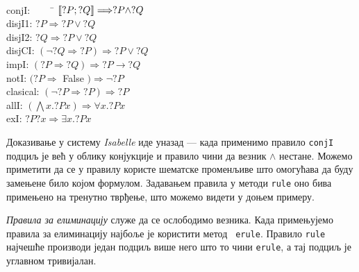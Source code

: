 \begin{small}
{\tt 
\begin{tabbing}
 conjI:\ \ \ \ \ \= $\llbracket ?P ; ?Q \rrbracket \Longrightarrow ?P \land ?Q$   \\
 disjI1: \> $?P \Longrightarrow ?P \lor ?Q$ \\
 disjI2: \> $?Q \Longrightarrow ?P \lor ?Q$ \\
 disjCI: \> $(\neg ?Q \Longrightarrow ?P) \Longrightarrow ?P \lor ?Q$ \\
 impI:   \> $(?P \Longrightarrow ?Q) \Longrightarrow ?P \longrightarrow ?Q$ \\
 notI:   \> $(?P \Longrightarrow$ False $) \Longrightarrow \neg ?P$ \\
 clasical: \> $(\neg ?P \Longrightarrow ?P) \Longrightarrow ?P$ \\
 allI:      \> $(\bigwedge x. ?P x) \Longrightarrow \forall x. ?P x$ \\
 exI:       \> $?P ?x \Longrightarrow \exists x. ?P x$
\end{tabbing}
}
\end{small}

Доказивање у систему \emph{Isabelle} иде уназад --- када применимо
правило {\tt conjI} подциљ је већ у облику конјукције и правило чини
да везник $\land$ нестане. Можемо приметити да се у правилу користе
шематске променљиве што омогућава да буду замењене било којом
формулом. Задавањем правила у методи {\tt rule} оно бива примењено на
тренутно тврђење, што можемо видети у доњем примеру.

\emph{Правила за елиминацију} служе да се ослободимо везника. Када
примењујемо правила за елиминацију најбоље је користити метод {\tt
  erule}. Правило {\tt rule} најчешће производи један подциљ више него
што то чини {\tt erule}, а тај подциљ је углавном тривијалан.

